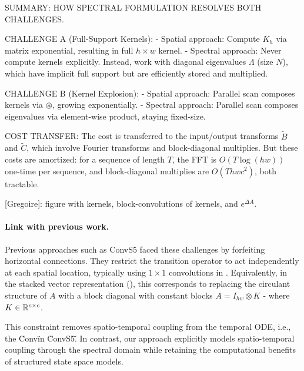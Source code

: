 \documentclass{article}
\newcommand{\greg}[1]{{\color{indigo}[Gregoire]: #1}}
\begin{document}
\begin{thomasbox}
SUMMARY: HOW SPECTRAL FORMULATION RESOLVES BOTH CHALLENGES.

CHALLENGE A (Full-Support Kernels):
- Spatial approach: Compute $\overline{K}_h$ via matrix exponential, resulting in full $h \times w$ kernel.
- Spectral approach: Never compute kernels explicitly. Instead, work with diagonal eigenvalues $\Lambda$ (size $N$), which have implicit full support but are efficiently stored and multiplied.

CHALLENGE B (Kernel Explosion):
- Spatial approach: Parallel scan composes kernels via $\circledast$, growing exponentially.
- Spectral approach: Parallel scan composes eigenvalues via element-wise product, staying fixed-size.

COST TRANSFER: The cost is transferred to the input/output transforms $\widetilde{B}$ and $\widetilde{C}$, which involve Fourier transforms and block-diagonal multiplies. But these costs are amortized: for a sequence of length $T$, the FFT is $O(T \log(hw))$ one-time per sequence, and block-diagonal multiplies are $O(T hwc^2)$, both tractable.
\end{thomasbox}

\greg{figure with kernels, block-convolutions of kernels, and $e^{\Delta A}$.}

\paragraph{Link with previous work.}
Previous approaches such as ConvS5 \citep{TODO} faced these challenges by forfeiting horizontal connections. They restrict the transition operator to act independently at each spatial location, typically using $1 \!\times\! 1$ convolutions in . Equivalently, in the stacked vector representation (), this corresponds to replacing the circulant structure of $A$ with a block diagonal with constant blocks $A = I_{hw} \otimes K$ - where $K \in \mathbb{R}^{c \times c}$.

This constraint removes spatio-temporal coupling from the temporal ODE, i.e., the \"Conv\" in \"ConvS5\". In contrast, our approach explicitly models spatio-temporal coupling through the spectral domain while retaining the computational benefits of structured state space models.
\end{document}
